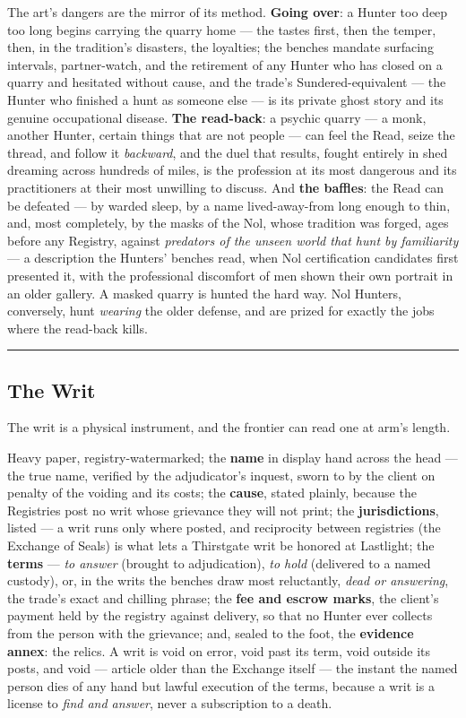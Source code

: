 The art's dangers are the mirror of its method. \textbf{Going over}: a Hunter too deep too long begins carrying the quarry home --- the tastes first, then the temper, then, in the tradition's disasters, the loyalties; the benches mandate surfacing intervals, partner-watch, and the retirement of any Hunter who has closed on a quarry and hesitated without cause, and the trade's Sundered-equivalent --- the Hunter who finished a hunt as someone else --- is its private ghost story and its genuine occupational disease. \textbf{The read-back}: a psychic quarry --- a monk, another Hunter, certain things that are not people --- can feel the Read, seize the thread, and follow it \textit{backward}, and the duel that results, fought entirely in shed dreaming across hundreds of miles, is the profession at its most dangerous and its practitioners at their most unwilling to discuss. And \textbf{the baffles}: the Read can be defeated --- by warded sleep, by a name lived-away-from long enough to thin, and, most completely, by the masks of the Nol, whose tradition was forged, ages before any Registry, against \textit{predators of the unseen world that hunt by familiarity} --- a description the Hunters' benches read, when Nol certification candidates first presented it, with the professional discomfort of men shown their own portrait in an older gallery. A masked quarry is hunted the hard way. Nol Hunters, conversely, hunt \textit{wearing} the older defense, and are prized for exactly the jobs where the read-back kills.

\medskip\hrule\medskip

\subsection{The Writ}

The writ is a physical instrument, and the frontier can read one at arm's length.

Heavy paper, registry-watermarked; the \textbf{name} in display hand across the head --- the true name, verified by the adjudicator's inquest, sworn to by the client on penalty of the voiding and its costs; the \textbf{cause}, stated plainly, because the Registries post no writ whose grievance they will not print; the \textbf{jurisdictions}, listed --- a writ runs only where posted, and reciprocity between registries (the Exchange of Seals) is what lets a Thirstgate writ be honored at Lastlight; the \textbf{terms} --- \textit{to answer} (brought to adjudication), \textit{to hold} (delivered to a named custody), or, in the writs the benches draw most reluctantly, \textit{dead or answering}, the trade's exact and chilling phrase; the \textbf{fee and escrow marks}, the client's payment held by the registry against delivery, so that no Hunter ever collects from the person with the grievance; and, sealed to the foot, the \textbf{evidence annex}: the relics. A writ is void on error, void past its term, void outside its posts, and void --- article older than the Exchange itself --- the instant the named person dies of any hand but lawful execution of the terms, because a writ is a license to \textit{find and answer}, never a subscription to a death.


